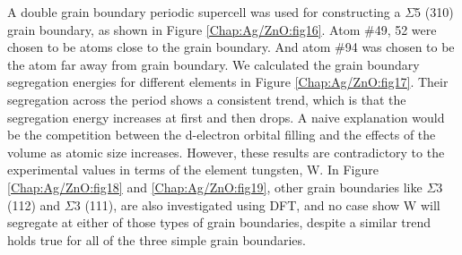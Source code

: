 A double grain boundary periodic supercell was used for constructing a $\Sigma$5 (310) grain boundary, as shown in Figure \ref{Chap:Ag/ZnO:fig16}. Atom \#49, 52 were chosen to be atoms close to the grain boundary. And atom \#94 was chosen to be the atom far away from grain boundary. We calculated the grain boundary segregation energies for different elements in Figure \ref{Chap:Ag/ZnO:fig17}. Their segregation across the period shows a consistent trend, which is that the segregation energy increases at first and then drops. A naive explanation would be the competition between the d-electron orbital filling and the effects of the volume as atomic size increases. However, these results are contradictory to the experimental values in terms of the element tungsten, W. \cite{chookajorn2012design,jiao2018nanocrystalline} In Figure \ref{Chap:Ag/ZnO:fig18} and \ref{Chap:Ag/ZnO:fig19}, other grain boundaries like $\Sigma$3 (112) and $\Sigma$3 (111), are also investigated using \ac{DFT}, and no case show W will segregate at either of those types of grain boundaries, despite a similar trend holds true for all of the three simple grain boundaries.

